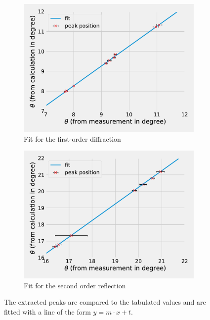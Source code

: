 \begin{figure}[h!]
    \centering
    \begin{subfigure}[b]{0.48\textwidth}
        \includegraphics[width =\textwidth]{Programming/Absorption/Eichung1ref.pdf}      
        \caption{Fit for the first-order diffraction}
      \label{fig:subfig1}
    \end{subfigure}
    \hfill
    \begin{subfigure}[b]{0.48\textwidth}
      \includegraphics[width = \textwidth]{Programming/Absorption/Eichung2ref.pdf}  
      \caption{Fit for the second order reflection}
      \label{fig:subfig2}
    \end{subfigure}
    \caption{The extracted peaks are compared to the tabulated values and are fitted with a line of the form $y = m\cdot x + t$.}
    \label{fig:mainfig}
\end{figure}

